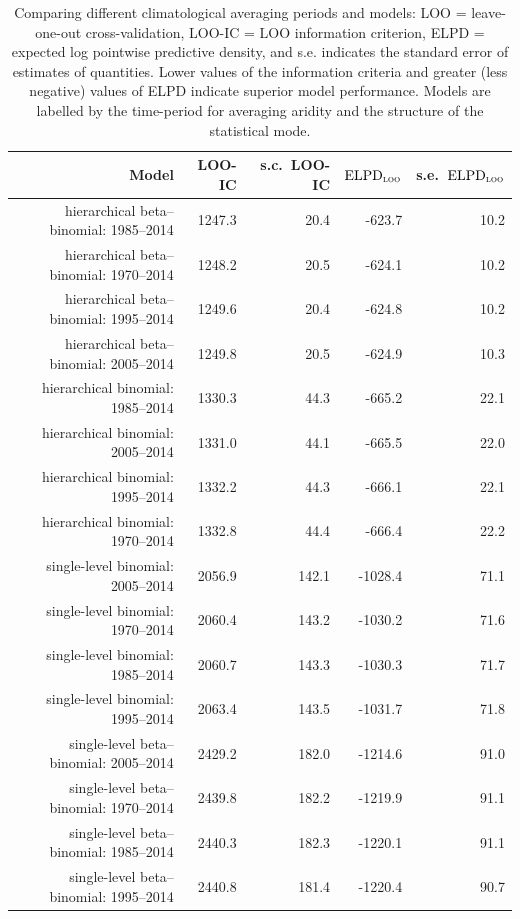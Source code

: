 \documentclass[draft]{agujournal}
\begin{document}
\begin{table}[H]
\centering
\begin{tabular}{rrrrr}
  \hline
Model & LOO-IC & s.c.\ LOO-IC & $\text{ELPD}_{\text{\scshape{loo}}}$ & s.e.\ $\text{ELPD}_{\text{\scshape{loo}}}$ \\
  \hline
hierarchical beta--binomial: 1985--2014 & 1247.3 & 20.4 & -623.7 & 10.2 \\
  hierarchical beta--binomial: 1970--2014 & 1248.2 & 20.5 & -624.1 & 10.2 \\
  hierarchical beta--binomial: 1995--2014 & 1249.6 & 20.4 & -624.8 & 10.2 \\
  hierarchical beta--binomial: 2005--2014 & 1249.8 & 20.5 & -624.9 & 10.3 \\
  hierarchical binomial: 1985--2014 & 1330.3 & 44.3 & -665.2 & 22.1 \\
  hierarchical binomial: 2005--2014 & 1331.0 & 44.1 & -665.5 & 22.0 \\
  hierarchical binomial: 1995--2014 & 1332.2 & 44.3 & -666.1 & 22.1 \\
  hierarchical binomial: 1970--2014 & 1332.8 & 44.4 & -666.4 & 22.2 \\
  single-level binomial: 2005--2014 & 2056.9 & 142.1 & -1028.4 & 71.1 \\
  single-level binomial: 1970--2014 & 2060.4 & 143.2 & -1030.2 & 71.6 \\
  single-level binomial: 1985--2014 & 2060.7 & 143.3 & -1030.3 & 71.7 \\
  single-level binomial: 1995--2014 & 2063.4 & 143.5 & -1031.7 & 71.8 \\
  single-level beta--binomial: 2005--2014 & 2429.2 & 182.0 & -1214.6 & 91.0 \\
  single-level beta--binomial: 1970--2014 & 2439.8 & 182.2 & -1219.9 & 91.1 \\
  single-level beta--binomial: 1985--2014 & 2440.3 & 182.3 & -1220.1 & 91.1 \\
  single-level beta--binomial: 1995--2014 & 2440.8 & 181.4 & -1220.4 & 90.7 \\
   \hline
\end{tabular}
\caption[Model comparison: LOO (climatological interval).]{Comparing different climatological averaging periods and models: LOO = leave-one-out cross-validation, LOO-IC = LOO information criterion, ELPD = expected log pointwise predictive density, and s.e. indicates the standard error of estimates of quantities. Lower values of the information criteria and greater (less negative) values of ELPD indicate superior model performance. Models are labelled by the time-period for averaging aridity and the structure of the statistical mode.}
\label{tab:loo.years}
\end{table}
\end{document}

